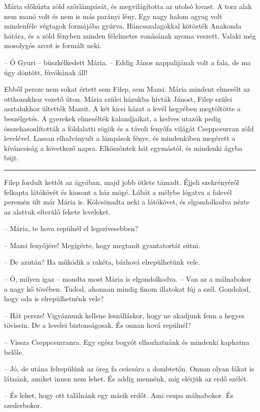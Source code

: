 \documentclass[10pt]{memoir}
\renewcommand{\pfbreakdisplay}{\bigskip \ding{166} \bigskip}
\newcommand{\secbreak}{\fancybreak{\pfbreakdisplay}\indent}
\begin{document}
Mária előhúzta zöld szőrlámpását, és megvilágította az utolsó lovast. A torz
alak nem manó volt és nem is más parányi lény. Egy nagy halom agyag volt
mindenféle végtagok formájába gyúrva. Háncsszalagokkal kötözték Anakonda
hátára, és a zöld fényben minden félelmetes vonásának nyoma veszett. Valaki még
mosolygós arcot is formált neki.

-- Ő Gyuri -- büszkélkedett Mária. -- Eddig János nappalijának volt a fala,
de ma úgy döntött, fúvókának áll!

Ebből persze nem sokat értett sem Filep, sem Mazsi. Mária mindent elmesélt az
otthonukhoz vezető úton. Mária szülei házukba hívták Jánost, Filep szülei
asztalukhoz ültették Mazsit. A két kicsi házat a levél hegyében megtöltötte a
beszélgetés. A gyerekek elmesélték kalandjaikat, a kedves utazók pedig
összehasonlították a földalatti rögök és a távoli fenyőfa világát Cseppcsurran
zöld levelével. Lassan elhalványult a lámpások fénye, és mindenkiben megérett a
kíváncsiság a következő napra. Elköszöntek hát egymástól, és mindenki ágyba
bújt.

\secbreak

Filep fordult kettőt az ágyában, majd jobb ötlete támadt. Éjjeli szekrényéről
felkapta látókövét és kiosont a ház mögé. Lábát a mélybe lógatva a falevél
peremén ült már Mária is. Kölcsönadta neki a látókövet, és elgondolkodva nézte
az alattuk elterülő fekete leveleket.

-- Mária, te hova repülnél el legszívesebben?

-- Mazsi fenyőjére! Megígérte, hogy megtanít gyantatortát sütni.

-- De azután? Ha működik a rakéta, bárhová elrepülhetünk vele.

-- Ó, milyen igaz -- mondta most Mária is elgondolkodva. -- Van az a
málnabokor a nagy kő tövében. Tudod, ahonnan mindig finom illatokat fúj a szél.
Gondolod, hogy oda is elrepülhetnénk vele?

-- Hát persze! Vigyáznunk kellene leszálláskor, hogy ne akadjunk fenn a hegyes
tövisein. De a levelei biztonságosak. És onnan hová repülnél?

-- Vissza Cseppcsurranra. Egy egész bogyót elhozhatnánk és mindenki kaphatna
belőle.

-- Jó, de utána felrepülünk az öreg fa csúcsára a dombtetőn. Onnan olyan fákat
is látnánk, amiket innen nem lehet. És addig mennénk, míg elérjük az erdő
szélét.

-- És lehet, hogy ott találnánk egy másik erdőt. Ami csupa málnabokor. És
szederbokor.
\end{document}
